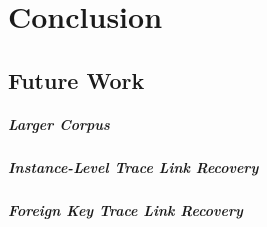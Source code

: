 \chapter{Conclusion}
\label{chapter:Conclusion}

\section{Future Work}

\paragraph*{Larger Corpus}
\paragraph*{Instance-Level Trace Link Recovery}
\paragraph*{Foreign Key Trace Link Recovery}